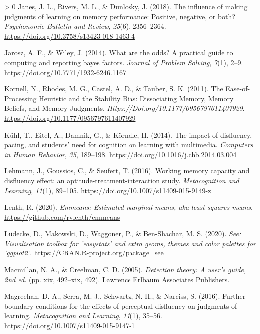 \documentclass[
  english,
  jou]{apa7}
\newlength{\cslhangindent}
\newenvironment{CSLReferences}[3] %
 {%
  \setlength{\parindent}{0pt}
  \ifodd #1 \everypar{\setlength{\hangindent}{\cslhangindent}}\ignorespaces\fi
  \ifnum #2 > 0
  \setlength{\parskip}{#2\baselineskip}
  \fi
 }%
 {}
\begin{document}
\begin{CSLReferences}{1}{0}
\leavevmode\hypertarget{ref-Janes2018}{}%
Janes, J. L., Rivers, M. L., \& Dunlosky, J. (2018). {The influence of making judgments of learning on memory performance: Positive, negative, or both?} \emph{Psychonomic Bulletin and Review}, \emph{25}(6), 2356--2364. \url{https://doi.org/10.3758/s13423-018-1463-4}

\leavevmode\hypertarget{ref-Jarosz2014}{}%
Jarosz, A. F., \& Wiley, J. (2014). {What are the odds? A practical guide to computing and reporting bayes factors}. \emph{Journal of Problem Solving}, \emph{7}(1), 2--9. \url{https://doi.org/10.7771/1932-6246.1167}

\leavevmode\hypertarget{ref-Kornell2011}{}%
Kornell, N., Rhodes, M. G., Castel, A. D., \& Tauber, S. K. (2011). {The Ease-of-Processing Heuristic and the Stability Bias: Dissociating Memory, Memory Beliefs, and Memory Judgments}. \emph{Https://Doi.org/10.1177/0956797611407929}. \url{https://doi.org/10.1177/0956797611407929}

\leavevmode\hypertarget{ref-Kuhl2014}{}%
Kühl, T., Eitel, A., Damnik, G., \& Körndle, H. (2014). {The impact of disfluency, pacing, and students' need for cognition on learning with multimedia}. \emph{Computers in Human Behavior}, \emph{35}, 189--198. \url{https://doi.org/10.1016/j.chb.2014.03.004}

\leavevmode\hypertarget{ref-Lehmann2016}{}%
Lehmann, J., Goussios, C., \& Seufert, T. (2016). {Working memory capacity and disfluency effect: an aptitude-treatment-interaction study}. \emph{Metacognition and Learning}, \emph{11}(1), 89--105. \url{https://doi.org/10.1007/s11409-015-9149-z}

\leavevmode\hypertarget{ref-R-emmeans}{}%
Lenth, R. (2020). \emph{Emmeans: Estimated marginal means, aka least-squares means}. \url{https://github.com/rvlenth/emmeans}

\leavevmode\hypertarget{ref-R-see}{}%
Lüdecke, D., Makowski, D., Waggoner, P., \& Ben-Shachar, M. S. (2020). \emph{See: Visualisation toolbox for 'easystats' and extra geoms, themes and color palettes for 'ggplot2'}. \url{https://CRAN.R-project.org/package=see}

\leavevmode\hypertarget{ref-Macmillan2005}{}%
Macmillan, N. A., \& Creelman, C. D. (2005). \emph{{Detection theory: A user's guide, 2nd ed.}} (pp. xix, 492--xix, 492). Lawrence Erlbaum Associates Publishers.

\leavevmode\hypertarget{ref-Magreehan2016}{}%
Magreehan, D. A., Serra, M. J., Schwartz, N. H., \& Narciss, S. (2016). {Further boundary conditions for the effects of perceptual disfluency on judgments of learning}. \emph{Metacognition and Learning}, \emph{11}(1), 35--56. \url{https://doi.org/10.1007/s11409-015-9147-1}


\end{CSLReferences}
\end{document}
